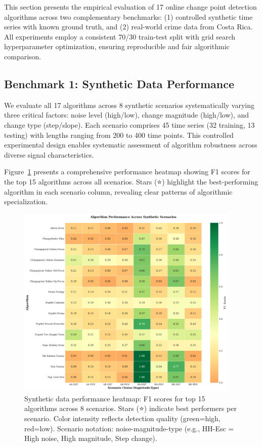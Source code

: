 \label{sec:results}

This section presents the empirical evaluation of 17 online change point detection algorithms across two complementary benchmarks: (1) controlled synthetic time series with known ground truth, and (2) real-world crime data from Costa Rica. All experiments employ a consistent 70/30 train-test split with grid search hyperparameter optimization, ensuring reproducible and fair algorithmic comparison.

\subsection{Benchmark 1: Synthetic Data Performance}
\label{sec:results_synthetic}

We evaluate all 17 algorithms across 8 synthetic scenarios systematically varying three critical factors: noise level (high/low), change magnitude (high/low), and change type (step/slope). Each scenario comprises 45 time series (32 training, 13 testing) with lengths ranging from 200 to 400 time points. This controlled experimental design enables systematic assessment of algorithm robustness across diverse signal characteristics.

Figure~\ref{fig:synthetic_heatmap} presents a comprehensive performance heatmap showing F1 scores for the top 15 algorithms across all scenarios. Stars (⭐) highlight the best-performing algorithm in each scenario column, revealing clear patterns of algorithmic specialization.

\begin{figure}[H]
\centering
\includegraphics[width=0.95\textwidth]{figures/fig_scenario_heatmap.pdf}
\caption{Synthetic data performance heatmap: F1 scores for top 15 algorithms across 8 scenarios. Stars (⭐) indicate best performers per scenario. Color intensity reflects detection quality (green=high, red=low). Scenario notation: noise-magnitude-type (e.g., HH-Esc = High noise, High magnitude, Step change).}
\label{fig:synthetic_heatmap}
\end{figure}

